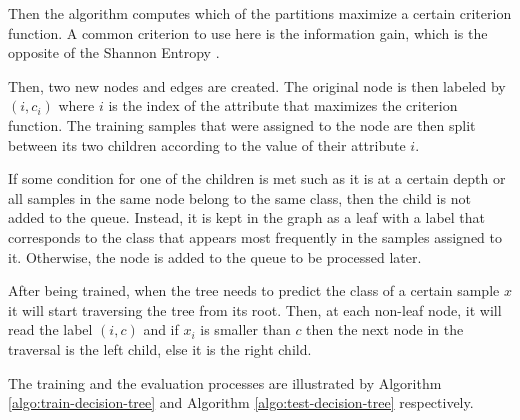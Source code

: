 Then the algorithm computes which of the partitions maximize a certain criterion function.
A common criterion to use here is the information gain, which is the opposite of the Shannon Entropy \cite{shannon1948mathematical}.

Then, two new nodes and edges are created.
The original node is then labeled by $(i, c_i)$ where $i$ is the index of the attribute that maximizes the criterion function.
The training samples that were assigned to the node are then split between its two children according to the value of their attribute $i$.

If some condition for one of the children is met such as it is at a certain depth or all samples in the same node belong to the same class, then the child is not added to the queue.
Instead, it is kept in the graph as a leaf with a label that corresponds to the class that appears most frequently in the samples assigned to it.
Otherwise, the node is added to the queue to be processed later.

After being trained, when the tree needs to predict the class of a certain sample $x$ it will start traversing the tree from its root. 
Then, at each non-leaf node, it will read the label $(i, c)$ and if $x_i$ is smaller than $c$ then the next node in the traversal is the left child, else it is the right child.

The training and the evaluation processes are illustrated by Algorithm \ref{algo:train-decision-tree} and Algorithm \ref{algo:test-decision-tree} respectively.

